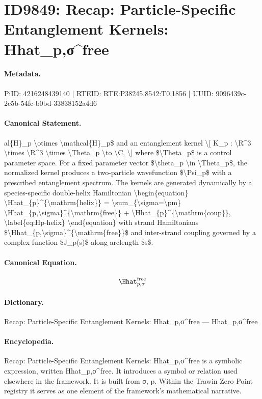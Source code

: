 \section*{ID9849: Recap: Particle-Specific Entanglement Kernels: Hhat\_p,σ\textasciicircum{}free}
\paragraph{Metadata.}
PiID: 4216248439140 | RTEID: RTE:P38245.8542:T0.1856 | UUID: 9096439c-2c5b-54fc-b0bd-33838152a4d6

\paragraph{Canonical Statement.}
al\{H\}\_p \textbackslash{}otimes \textbackslash{}mathcal\{H\}\_p\$ and an entanglement kernel \textbackslash{}[ K\_p : \textbackslash{}R\textasciicircum{}3 \textbackslash{}times \textbackslash{}R\textasciicircum{}3 \textbackslash{}times \textbackslash{}Theta\_p \textbackslash{}to \textbackslash{}C, \textbackslash{}] where \$\textbackslash{}Theta\_p\$ is a control parameter space. For a fixed parameter vector \$\textbackslash{}theta\_p \textbackslash{}in \textbackslash{}Theta\_p\$, the normalized kernel produces a two-particle wavefunction \$\textbackslash{}Psi\_p\$ with a prescribed entanglement spectrum. The kernels are generated dynamically by a species-specific double-helix Hamiltonian \textbackslash{}begin\{equation\} \textbackslash{}Hhat\_\{p\}\textasciicircum{}\{\textbackslash{}mathrm\{helix\}\} = \textbackslash{}sum\_\{\textbackslash{}sigma=\textbackslash{}pm\} \textbackslash{}Hhat\_\{p,\textbackslash{}sigma\}\textasciicircum{}\{\textbackslash{}mathrm\{free\}\} + \textbackslash{}Hhat\_\{p\}\textasciicircum{}\{\textbackslash{}mathrm\{coup\}\}, \textbackslash{}label\{eq:Hp-helix\} \textbackslash{}end\{equation\} with strand Hamiltonians \$\textbackslash{}Hhat\_\{p,\textbackslash{}sigma\}\textasciicircum{}\{\textbackslash{}mathrm\{free\}\}\$ and inter-strand coupling governed by a complex function \$J\_p(s)\$ along arclength \$s\$.

\paragraph{Canonical Equation.}
\[
\Hhat_{p,\sigma}^{\mathrm{free}}
\]

\paragraph{Dictionary.}
Recap: Particle-Specific Entanglement Kernels: Hhat\_p,σ\textasciicircum{}free — Hhat\_p,σ\textasciicircum{}free

\paragraph{Encyclopedia.}
Recap: Particle-Specific Entanglement Kernels: Hhat\_p,σ\textasciicircum{}free is a symbolic expression, written Hhat\_p,σ\textasciicircum{}free. It introduces a symbol or relation used elsewhere in the framework. It is built from σ, p. Within the Trawin Zero Point registry it serves as one element of the framework's mathematical narrative.
